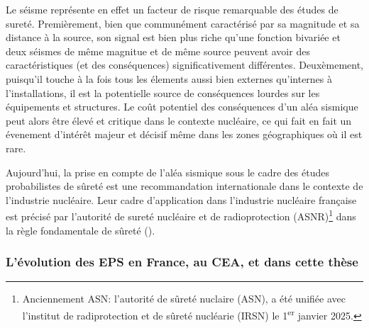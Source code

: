 Le séisme représente en effet un facteur de risque remarquable des études de sureté.
Premièrement, bien que communément caractérisé par sa magnitude et sa distance à la source, son signal est bien plus riche qu'une fonction bivariée et deux séismes de même magnitue et de même source peuvent avoir des caractéristiques (et des conséquences) significativement différentes.
Deuxèmement, puisqu'il touche à la fois tous les élements aussi bien externes qu'internes à l'installations, il est la potentielle source de conséquences lourdes sur les équipements et structures.
Le coût potentiel des conséquences d'un aléa sismique peut alors être élevé et critique dans le contexte nucléaire, ce qui fait en fait un évenement d'intérêt majeur et décisif même dans les zones géographiques où il est rare.



Aujourd'hui, la prise en compte de l'aléa sismique sous le cadre des études probabilistes de sûreté est une recommandation internationale dans le contexte de l'industrie nucléaire. Leur cadre d'application dans l'industrie nucléaire française est précisé par l'autorité de sureté nucléaire et de radioprotection (ASNR)\footnote{Anciennement ASN: l'autorité de sûreté nuclaire (ASN), a été unifiée avec l'institut de radiprotection et de sûreté nucléarie (IRSN) le 1\textsuperscript{er} janvier 2025.} dans la règle fondamentale de sûreté (\cite{asn_regle_2002}).









\subsubsection{L'évolution des EPS en France, au CEA, et dans cette thèse}






